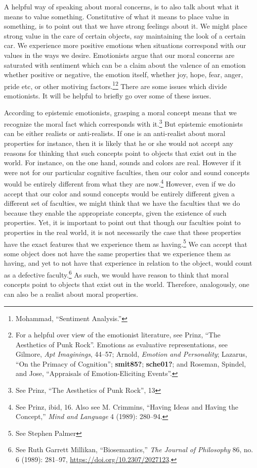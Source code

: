\documentclass[phdthesis,12pt,final]{wuthesis}
\theoremstyle{definition}
\theoremstyle{definition}
\theoremstyle{definition}
\theoremstyle{definition}
\theoremstyle{remark}
\begin{document}
A helpful way of speaking about moral concerns, is to also talk about what it means to value something. Constitutive of what it means to place value in something, is to point out that we have strong feelings about it. We might place strong value in the care of certain objects, say maintaining the look of a certain car. We experience more positive emotions when situations correspond with our values in the ways we desire. Emotionists argue that our moral concerns are saturated with sentiment which can be a claim about the valence of an emotion whether positive or negative, the emotion itself, whether joy, hope, fear, anger, pride etc, or other motiving factors.\footnote{Mohammad, {``Sentiment {Analysis}.''}}\footnote{For a helpful over view of the emotionist literature, see Prinz, {``The {Aesthetics} of {Punk Rock}''}. Emotions as evaluative representations, see Gilmore, \emph{Apt {Imaginings}}, 44--57; Arnold, \emph{Emotion and {Personality}}; Lazarus, {``On the {Primacy} of {Cognition}''}; \textbf{smit85?}; \textbf{sche01?}; and Roseman, Spindel, and Jose, {``Appraisals of Emotion-Eliciting Events''}.} There are some issues which divide emotionists. It will be helpful to briefly go over some of these issues.

According to epistemic emotionists, grasping a moral concept means that we recognize the moral fact which corresponds with it.\footnote{See Prinz, {``The {Aesthetics} of {Punk Rock}''}, 13} But epistemic emotionists can be either realists or anti-realists. If one is an anti-realist about moral properties for instance, then it is likely that he or she would not accept any reasons for thinking that such concepts point to objects that exist out in the world. For instance, on the one hand, sounds and colors are real. However if it were not for our particular cognitive faculties, then our color and sound concepts would be entirely different from what they are now.\footnote{See Prinz, ibid, 16. Also see M. Crimmins, {``Having Ideas and Having the Concept,''} \emph{Mind and Language} 4 (1989): 280--94.} However, even if we do accept that our color and sound concepts would be entirely different given a different set of faculties, we might think that we have the faculties that we do because they enable the appropriate concepts, given the existence of such properties. Yet, it is important to point out that though our faculties point to properties in the real world, it is not necessarily the case that these properties have the exact features that we experience them as having.\footnote{See Stephen Palmer} We can accept that some object does not have the same properties that we experience them as having, and yet to not have that experience in relation to the object, would count as a defective faculty.\footnote{See Ruth Garrett Millikan, {``Biosemantics,''} \emph{The Journal of Philosophy} 86, no. 6 (1989): 281--97, \url{https://doi.org/10.2307/2027123}.} As such, we would have reason to think that moral concepts point to objects that exist out in the world. Therefore, analogously, one can also be a realist about moral properties.
\end{document}
